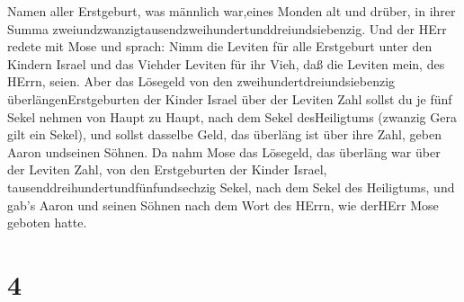 Namen aller Erstgeburt, was männlich war,eines Monden alt und drüber, in
ihrer Summa zweiundzwanzigtausendzweihundertunddreiundsiebenzig.
 Und der HErr redete mit Mose und sprach: 
Nimm die Leviten für alle Erstgeburt unter den Kindern Israel und das
Viehder Leviten für ihr Vieh, daß die Leviten mein, des HErrn, seien.
 Aber das Lösegeld von den zweihundertdreiundsiebenzig
überlängenErstgeburten der Kinder Israel über der Leviten Zahl
 sollst du je fünf Sekel nehmen von Haupt zu Haupt, nach
dem Sekel desHeiligtums (zwanzig Gera gilt ein Sekel),  und
sollst dasselbe Geld, das überläng ist über ihre Zahl, geben Aaron
undseinen Söhnen.  Da nahm Mose das Lösegeld, das überläng
war über der Leviten Zahl,  von den Erstgeburten der Kinder
Israel, tausenddreihundertundfünfundsechzig Sekel, nach dem Sekel des
Heiligtums,  und gab's Aaron und seinen Söhnen nach dem
Wort des HErrn, wie derHErr Mose geboten hatte.

\hypertarget{section-3}{%
\section{4}\label{section-3}}

